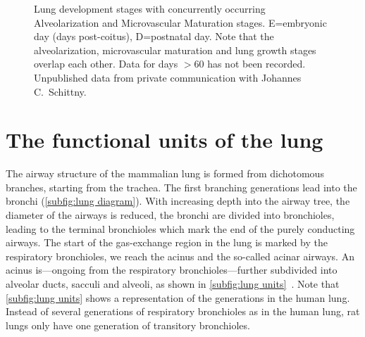 \begin{figure}
	\noindent\makebox[\textwidth]{%
		\centering%
		}%
	\caption[Lung development stages]{Lung development stages with concurrently occurring Alveolarization and Microvascular Maturation stages. E=embryonic day (days post-coitus), D=postnatal day. Note that the alveolarization, microvascular maturation and lung growth stages overlap each other. Data for days $>$60 has not been recorded. Unpublished data from private communication with Johannes C.\ Schittny.}
	\label{fig:lung development stages new}
\end{figure}

\section{The functional units of the lung}
The airway structure of the mammalian lung is formed from dichotomous branches, starting from the trachea. The first branching generations lead into the bronchi (\autoref{subfig:lung diagram}). With increasing depth into the airway tree, the diameter of the airways is reduced, the bronchi are divided into bronchioles, leading to the terminal bronchioles which mark the end of the purely conducting airways. The start of the gas-exchange region in the lung is marked by the respiratory bronchioles, we reach the acinus and the so-called acinar airways. An acinus is---ongoing from the respiratory bronchioles---further subdivided into alveolar ducts, sacculi and alveoli, as shown in \autoref{subfig:lung units}~\cite{Haefeli-Bleuer1988,Weibel1963,Weibel2009,Schittny2007a}. Note that \autoref{subfig:lung units} shows a representation of the generations in the human lung. Instead of several generations of respiratory bronchioles as in the human lung, rat lungs only have one generation of transitory bronchioles.

